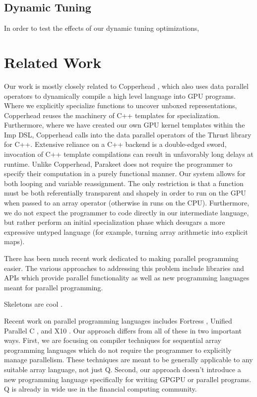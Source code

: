 \documentclass[preprint]{sigplanconf}
\begin{document}
\subsection{Dynamic Tuning}
In order to test the effects of our dynamic tuning optimizations, 

\section{Related Work}
\label{RelatedWork}

Our work is mostly closely related to Copperhead \cite{Cata10}, which also uses data parallel operators to dynamically compile a high level language into GPU programs. Where we explicitly specialize functions to uncover unboxed representations, Copperhead reuses the machinery of C++ templates for specialization. Furthermore, where we have created our own GPU kernel templates within the Imp DSL, Copperhead calls into the data parallel operators of the Thrust library for C++. Extensive reliance on a C++ backend is a double-edged sword, invocation of C++ template compilations can result in unfavorably long delays at runtime. Unlike Copperhead, Parakeet does not require the programmer to specify their computation in a purely functional manner. Our system allows for both looping and variable reassignment. The only restriction is that a function must be both referentially transparent and shapely in order to run on the GPU when passed to an array operator (otherwise in runs on the CPU). Furthermore, we do not expect the programmer to code directly in our intermediate language, but rather perform an initial specialization phase which desugars a more expressive untyped language (for example, turning array arithmetic into explicit maps). 

There has been much recent work dedicated to making parallel programming easier.
The various approaches to addressing this problem include libraries and APIs
which provide parallel functionality as well as new programming languages meant
for parallel programming.

Skeletons are cool \cite{Cole04}.

Recent work on parallel programming languages includes Fortress \cite{Alle08},
Unified Parallel C \cite{Char05}, and X10 \cite{Chen05}.  Our approach differs
from all of these in two important ways.  First, we are focusing on compiler
techniques for sequential array programming languages which do not require the
programmer to explicitly manage parallelism.  These techniques are meant to be
generally applicable to any suitable array language, not just Q.  Second, our
approach doesn't introduce a new programming language specifically for writing
GPGPU or parallel programs.  Q is already in wide use in the financial computing
community.
\end{document}
